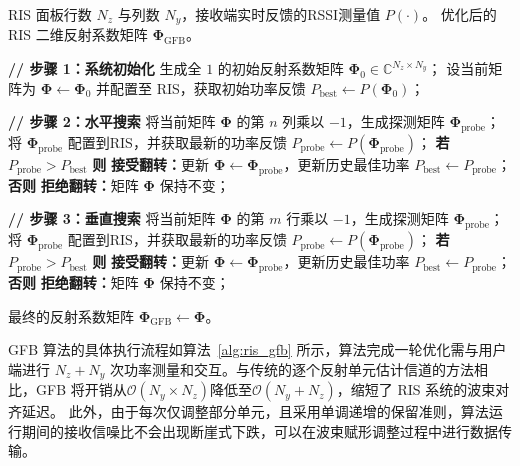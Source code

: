 \begin{algorithm}[!htbp]
	\caption{快速贪婪波束赋形算法（GFB）}
	\label{alg:ris_gfb}
	\begin{algorithmic}[1]
		\REQUIRE RIS 面板行数 $N_z$ 与列数 $N_y$，接收端实时反馈的RSSI测量值 $P(\cdot)$。
		\ENSURE 优化后的 RIS 二维反射系数矩阵 $\bm{\Phi}_{\text{GFB}}$。
		
		\STATE \textbf{// 步骤 1：系统初始化}
		\STATE 生成全 $1$ 的初始反射系数矩阵 $\bm{\Phi}_{0} \in \mathbb{C}^{N_z \times N_y}$；
		\STATE 设当前矩阵为 $\bm{\Phi} \leftarrow \bm{\Phi}_0$ 并配置至 RIS，获取初始功率反馈 $P_{\text{best}} \leftarrow P(\bm{\Phi}_0)$；
		
		\STATE \textbf{// 步骤 2：水平搜索}
		\STATE 将当前矩阵 $\bm{\Phi}$ 的第 $n$ 列乘以 $-1$，生成探测矩阵 $\bm{\Phi}_{\text{probe}}$；
		\STATE 将 $\bm{\Phi}_{\text{probe}}$ 配置到RIS，并获取最新的功率反馈 $P_{\text{probe}} \leftarrow P(\bm{\Phi}_{\text{probe}})$；
		\STATE \textbf{若} $P_{\text{probe}} > P_{\text{best}}$ \textbf{则} 
		\STATE \quad \textbf{接受翻转：}更新 $\bm{\Phi} \leftarrow \bm{\Phi}_{\text{probe}}$，更新历史最佳功率 $P_{\text{best}} \leftarrow P_{\text{probe}}$；
		\STATE \textbf{否则}
		\STATE \quad \textbf{拒绝翻转：}矩阵 $\bm{\Phi}$ 保持不变；
		\ENDFOR
		
		\STATE \textbf{// 步骤 3：垂直搜索}
		\STATE 将当前矩阵 $\bm{\Phi}$ 的第 $m$ 行乘以 $-1$，生成探测矩阵 $\bm{\Phi}_{\text{probe}}$；
		\STATE 将 $\bm{\Phi}_{\text{probe}}$ 配置到RIS，并获取最新的功率反馈 $P_{\text{probe}} \leftarrow P(\bm{\Phi}_{\text{probe}})$；
		\STATE \textbf{若} $P_{\text{probe}} > P_{\text{best}}$ \textbf{则} 
		\STATE \quad \textbf{接受翻转：}更新 $\bm{\Phi} \leftarrow \bm{\Phi}_{\text{probe}}$，更新历史最佳功率 $P_{\text{best}} \leftarrow P_{\text{probe}}$；
		\STATE \textbf{否则}
		\STATE \quad \textbf{拒绝翻转：}矩阵 $\bm{\Phi}$ 保持不变；
		\ENDFOR
		
		\RETURN 最终的反射系数矩阵 $\bm{\Phi}_{\text{GFB}} \leftarrow \bm{\Phi}$。
	\end{algorithmic}
\end{algorithm}


GFB 算法的具体执行流程如算法~\ref{alg:ris_gfb} 所示，算法完成一轮优化需与用户端进行 $N_z + N_y$ 次功率测量和交互。与传统的逐个反射单元估计信道的方法相比，GFB 将开销从$\mathcal{O}(N_y \times N_z)$降低至$\mathcal{O}(N_y + N_z)$，缩短了 RIS 系统的波束对齐延迟。
此外，由于每次仅调整部分单元，且采用单调递增的保留准则，算法运行期间的接收信噪比不会出现断崖式下跌，可以在波束赋形调整过程中进行数据传输。


